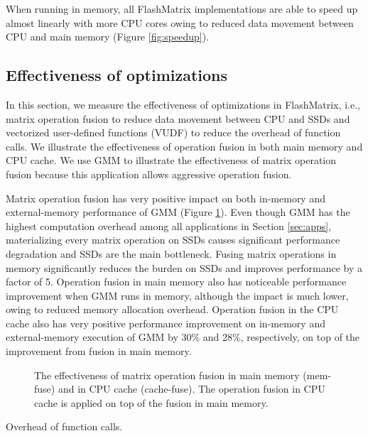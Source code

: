 When running in memory, all FlashMatrix implementations are able to speed up
almost linearly with more CPU cores owing to reduced data movement between
CPU and main memory (Figure \ref{fig:speedup}).

\subsection{Effectiveness of optimizations}

In this section, we measure the effectiveness of optimizations in FlashMatrix,
i.e., matrix operation fusion to reduce data movement between CPU and SSDs and
vectorized user-defined functions (VUDF) to reduce the overhead of function
calls. We illustrate the effectiveness of operation fusion in both main memory
and CPU cache. We use GMM to illustrate the effectiveness of matrix
operation fusion because this application allows aggressive operation fusion.

Matrix operation fusion has very positive impact on both in-memory and
external-memory performance of GMM (Figure \ref{perf:mem_move}). Even though
GMM has the highest computation overhead among all applications in Section
\ref{sec:apps}, materializing every matrix operation on SSDs causes significant
performance degradation and SSDs are the main bottleneck. Fusing matrix
operations in memory significantly reduces the burden on SSDs and improves
performance by a factor of 5. Operation fusion in main memory also has noticeable
performance improvement when GMM runs in memory, although the impact is much
lower, owing to reduced memory allocation overhead. Operation fusion in
the CPU cache also has very positive performance improvement on in-memory
and external-memory execution of GMM by 30\% and 28\%, respectively, on top of
the improvement from fusion in main memory.

\begin{figure}
	\begin{center}
		\footnotesize
		
		\caption{The effectiveness of matrix operation fusion in main memory
			(mem-fuse) and in CPU cache (cache-fuse). The operation fusion in
		CPU cache is applied on top of the fusion in main memory.}
		\label{perf:mem_move}
	\end{center}
\end{figure}

Overhead of function calls.
